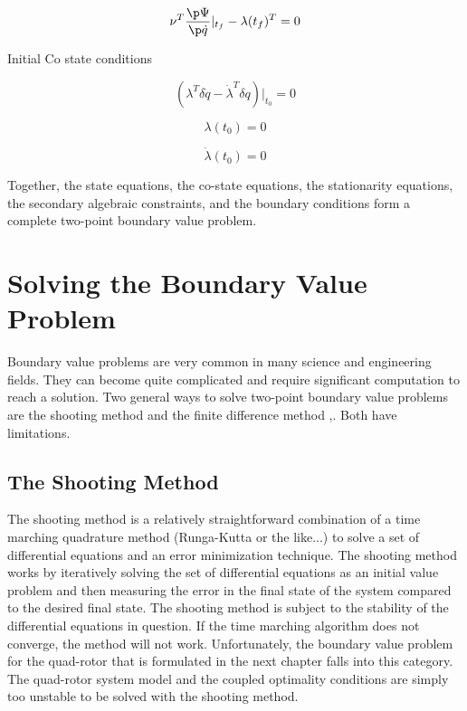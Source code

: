 \begin{equation}
    \nu^T \frac{\p \Psi}{\p \dot q}|_{t_f} - \lambda(t_f)^T = 0
\end{equation}


Initial Co state conditions

\begin{equation}
    ( \lambda^T \delta \dot q - \dot \lambda^T \delta q )|_{t_0} = 0
\end{equation}

\begin{equation}
    \lambda(t_0) = 0
\end{equation}

\begin{equation}
    \label{initialcostateder}
    \dot \lambda(t_0) = 0
\end{equation}

Together, the state equations, the co-state equations, the stationarity equations, the secondary algebraic constraints, and the boundary conditions form a complete two-point boundary value problem. 


\section{Solving the Boundary Value Problem}

Boundary value problems are very common in many science and engineering fields. They can become quite complicated and require significant computation to reach a solution. Two general ways to solve two-point boundary value problems are the shooting method and the finite difference method \cite{keller1992numerical},\cite{rao2001applied}. Both have limitations. 

\subsection{The Shooting Method}

The shooting method is a relatively straightforward combination of a time marching quadrature method (Runga-Kutta or the like...) to solve a set of differential equations and an error minimization technique. The shooting method works by iteratively solving the set of differential equations as an initial value problem and then measuring the error in the final state of the system compared to the desired final state. The shooting method is subject to the stability of the differential equations in question. If the time marching algorithm does not converge, the method will not work. Unfortunately, the boundary value problem for the quad-rotor that is formulated in the next chapter falls into this category. The quad-rotor system model and the coupled optimality conditions are simply too unstable to be solved with the shooting method. 

